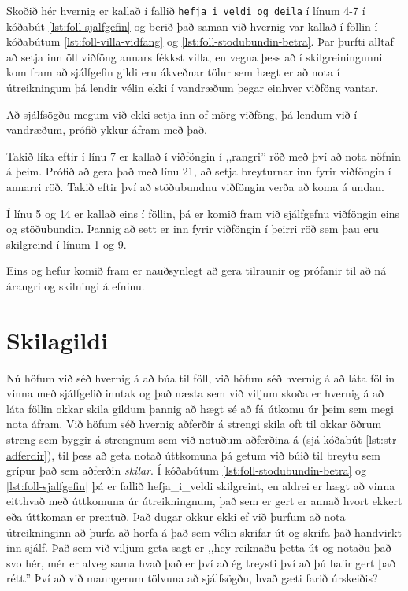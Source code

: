 Skoðið hér hvernig er kallað í fallið \texttt{hefja\_i\_veldi\_og\_deila} í línum 4-7 í kóðabút \ref{lst:foll-sjalfgefin} og berið það saman við hvernig var kallað í föllin í kóðabútum \ref{lst:foll-villa-vidfang} og \ref{lst:foll-stodubundin-betra}.
Þar þurfti alltaf að setja inn öll viðföng annars fékkst villa, en vegna þess að í  skilgreiningunni kom fram að sjálfgefin gildi eru ákveðnar tölur sem hægt er að nota í útreikningum þá lendir vélin ekki í vandræðum þegar einhver viðföng vantar.

Að sjálfsögðu megum við ekki setja inn of mörg viðföng, þá lendum við í vandræðum, prófið ykkur áfram með það.

Takið líka eftir í línu 7 er kallað í viðföngin í ,,rangri'' röð með því að nota nöfnin á þeim.
Prófið að gera það með línu 21, að setja breyturnar inn fyrir viðföngin í annarri röð.
Takið eftir því að stöðubundnu viðföngin verða að koma á undan.

Í línu 5 og 14 er kallað eins í föllin, þá er komið fram við sjálfgefnu viðföngin eins og stöðubundin.
Þannig að sett er inn fyrir viðföngin í þeirri röð sem þau eru skilgreind í línum 1 og 9.

Eins og hefur komið fram er nauðsynlegt að gera tilraunir og prófanir til að ná árangri og skilningi á efninu.


\section{Skilagildi}\label{uk:skilagildi}
Nú höfum við séð hvernig á að búa til föll, við höfum séð hvernig á að láta föllin vinna með sjálfgefið inntak og það næsta sem við viljum skoða er hvernig á að láta föllin okkar skila gildum þannig að hægt sé að fá útkomu úr þeim sem megi nota áfram.
Við höfum séð hvernig aðferðir á strengi skila oft til okkar öðrum streng sem byggir á strengnum sem við notuðum aðferðina á (sjá kóðabút \ref{lst:str-adferdir}), til þess að geta notað úttkomuna þá getum við búið til breytu sem grípur það sem aðferðin \textit{skilar}.
Í kóðabútum \ref{lst:foll-stodubundin-betra} og \ref{lst:foll-sjalfgefin} þá er fallið hefja\_i\_veldi skilgreint, en aldrei er hægt að vinna eitthvað með úttkomuna úr útreikningnum, það sem er gert er annað hvort ekkert eða úttkoman er prentuð.
Það dugar okkur ekki ef við þurfum að nota útreikninginn að þurfa að horfa á það sem vélin skrifar út og skrifa það handvirkt inn sjálf.
Það sem við viljum geta sagt er ,,hey reiknaðu þetta út og notaðu það svo hér, mér er alveg sama hvað það er því að ég treysti því að þú hafir gert það rétt.''
Því að við manngerum tölvuna að sjálfsögðu, hvað gæti farið úrskeiðis?

